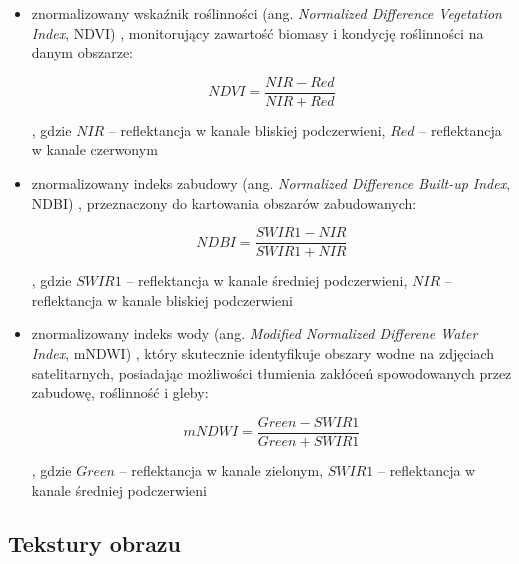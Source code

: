 \documentclass{amuthesis}
\begin{document}
\begin{itemize}
\item
  znormalizowany wskaźnik roślinności (ang. \emph{Normalized Difference
  Vegetation Index}, NDVI) \autocite{ndvi}, monitorujący zawartość
  biomasy i kondycję roślinności na danym obszarze:

  \[
  NDVI = \frac{NIR - Red}{NIR + Red}
  \]

  , gdzie \(NIR\) -- reflektancja w kanale bliskiej podczerwieni,
  \(Red\) -- reflektancja w kanale czerwonym
\item
  znormalizowany indeks zabudowy (ang. \emph{Normalized Difference
  Built-up Index}, NDBI) \autocite{ndbi}, przeznaczony do kartowania
  obszarów zabudowanych:

  \[
  NDBI = \frac{SWIR1 - NIR}{SWIR1 + NIR}
  \]

  , gdzie \(SWIR1\) -- reflektancja w kanale średniej podczerwieni,
  \(NIR\) -- reflektancja w kanale bliskiej podczerwieni
\item
  znormalizowany indeks wody (ang. \emph{Modified Normalized Differene
  Water Index}, mNDWI) \autocite{mndwi}, który skutecznie identyfikuje
  obszary wodne na zdjęciach satelitarnych, posiadając możliwości
  tłumienia zakłóceń spowodowanych przez zabudowę, roślinność i gleby:

  \[
  mNDWI = \frac{Green - SWIR1}{Green + SWIR1}
  \]

  , gdzie \(Green\) -- reflektancja w kanale zielonym, \(SWIR1\) --
  reflektancja w kanale średniej podczerwieni
\end{itemize}

\hypertarget{sec-textures}{%
\subsection{Tekstury obrazu}\label{sec-textures}}
\end{document}
